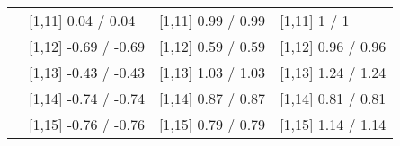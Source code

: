 \begin{table}
\begin{tabular}[t]{llll}
 & {}[1,11] 0.04  / 0.04 & {}[1,11] 0.99  / 0.99 & {}[1,11] 1  / 1\\
 & {}[1,12] -0.69  / -0.69 & {}[1,12] 0.59  / 0.59 & {}[1,12] 0.96  / 0.96\\
\addlinespace
 & {}[1,13] -0.43  / -0.43 & {}[1,13] 1.03  / 1.03 & {}[1,13] 1.24  / 1.24\\
 & {}[1,14] -0.74  / -0.74 & {}[1,14] 0.87  / 0.87 & {}[1,14] 0.81  / 0.81\\
 & {}[1,15] -0.76  / -0.76 & {}[1,15] 0.79  / 0.79 & {}[1,15] 1.14  / 1.14\\
\bottomrule
\end{tabular}
\end{table}
